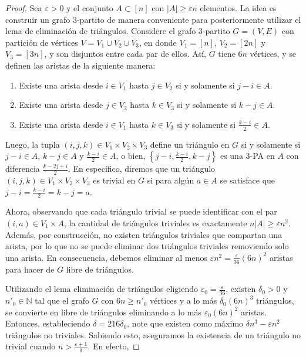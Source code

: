 \documentclass{article}[14pts]
\let\varepsilon=\varepsilon
\begin{document}
\begin{proof}
    Sea $\varepsilon > 0$ y el conjunto $A\subset [n]$ con $|A|\geq\varepsilon n$ elementos. La idea es construir un grafo $3$-partito de manera conveniente para posteriormente utilizar el lema de eliminación de triángulos. Considere el grafo 3-partito $G = (V,E)$ con partición de vértices $V = V_1 \cup V_2 \cup V_3$, en donde $V_1 = [n]$, $V_2 = [2n]$ y $V_3 = [3n]$, y son disjuntos entre cada par de ellos. Así, $G$ tiene $6n$ vértices, y se definen las aristas de la siguiente manera:\medskip

    \begin{enumerate}
        \item Existe una arista desde $i\in V_1$ hasta $j\in V_2$ si y solamente si $j-i\in A$.
        \item Existe una arista desde $j\in V_2$ hasta $k\in V_3$ si y solamente si $k-j\in A$.
        \item Existe una arista desde $i\in V_1$ hasta $k\in V_3$ si y solamente si $\frac{k-i}{2}\in A$.
    \end{enumerate}\medskip

    Luego, la tupla $(i,j,k)\in V_1\times V_2\times V_3$ define un triángulo en $G$ si y solamente si $j-i\in A$, $k-j\in A$ y $\frac{k-i}{2}\in A$, o bien, $\left\lbrace j-i, \frac{k-i}{2}, k-j\right\rbrace$ es una $3$-PA en $A$ con diferencia $\frac{k-2j+i}{2}$. En específico, diremos que un triángulo $(i,j,k)\in V_1\times V_2\times V_3$ es trivial en $G$ si para algún $a\in A$ se satisface que $j-i = \frac{k-i}{2} = k-j = a$.\medskip

    Ahora, observando que cada triángulo trivial se puede identificar con el par $(i,a)\in V_1 \times A$, la cantidad de triángulos triviales es exactamente $n|A| \geq \varepsilon n^{2}$. Además, por construcción, no existen triángulos triviales que compartan una arista, por lo que no se puede eliminar dos triángulos triviales removiendo solo una arista. En consecuencia, debemos eliminar al menos $\varepsilon n^{2} = \frac{\varepsilon}{36}(6n)^{2}$ aristas para hacer de $G$ libre de triángulos.\medskip

    Utilizando el lema eliminación de triángulos eligiendo $\varepsilon_0 = \frac{\varepsilon}{36}$, existen $\delta_0 > 0$ y $n'_0\in\mathbb{N}$ tal que el grafo $G$ con $6n \geq n'_0$ vértices y a lo más $\delta_0 (6n)^{3}$ triángulos, se convierte en libre de triángulos eliminando a lo más $\varepsilon_0 (6n)^{2}$ aristas. Entonces, estableciendo $\delta = 216\delta_0$, note que existen como máximo $\delta n^{3} - \varepsilon n^{2}$ triángulos no triviales. Sabiendo esto, aseguramos la existencia de un triángulo no trivial cuando $n > \frac{\varepsilon + 1}{\delta}$. En efecto,\medskip
    

\end{proof}
\end{document}
